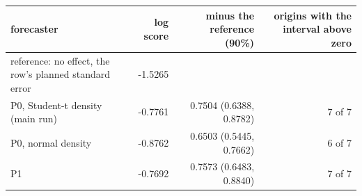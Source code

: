 \begin{tabular}{lrrr}
\toprule
forecaster & log score & minus the reference (90\%) & origins with the interval above zero \\
\midrule
reference: no effect, the row's planned standard error & -1.5265 &  &  \\
P0, Student-t density (main run) & -0.7761 & 0.7504 (0.6388, 0.8782) & 7 of 7 \\
P0, normal density & -0.8762 & 0.6503 (0.5445, 0.7662) & 6 of 7 \\
P1 & -0.7692 & 0.7573 (0.6483, 0.8840) & 7 of 7 \\
\bottomrule
\end{tabular}
